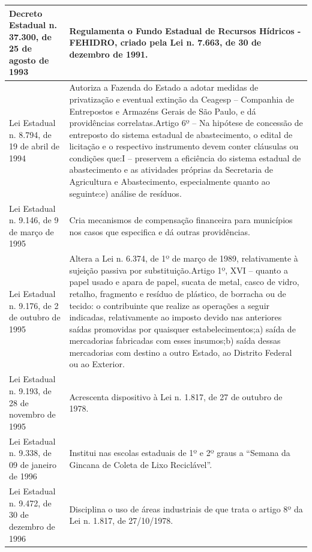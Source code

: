\begin{center}
\begin{longtable}{|p{}|p{}|}
			\hline
			Decreto Estadual n. 37.300, de 25 de agosto de 1993 & Regulamenta o Fundo Estadual de Recursos Hídricos  - FEHIDRO, criado pela Lei n. 7.663, de 30 de dezembro de 1991. \\
			\hline
			Lei Estadual n. 8.794, de 19 de abril de 1994 & Autoriza  a  Fazenda  do  Estado  a  adotar  medidas  de  privatização  e  eventual extinção da Ceagesp – Companhia de Entrepostos e Armazéns Gerais de São Paulo, e dá providências correlatas.\newline{}Artigo  6º  –  Na  hipótese  de  concessão  de  entreposto  do  sistema  estadual  de abastecimento,  o  edital  de  licitação  e  o  respectivo  instrumento  devem  conter cláusulas ou condições que:\newline{}I – preservem a eficiência do sistema estadual de abastecimento e as atividades próprias da Secretaria de Agricultura e Abastecimento, especialmente quanto ao seguinte:\newline{}e) análise de resíduos. \\
			\hline
			Lei Estadual n. 9.146, de 9 de março de 1995 & Cria  mecanismos  de  compensação  financeira  para  municípios  nos  casos  que especifica e dá outras providências. \\
			\hline
			Lei Estadual n. 9.176, de 2 de outubro de 1995 & Altera a Lei n. 6.374, de 1º de março de 1989, relativamente à sujeição passiva por substituição.\newline{}Artigo 1º, XVI – quanto a papel usado e apara de papel, sucata de metal, casco de vidro, retalho, fragmento e resíduo de plástico, de borracha ou de tecido: o contribuinte  que  realize  as  operações  a  seguir  indicadas,  relativamente  ao imposto     devido     nas     anteriores     saídas     promovidas     por     quaisquer estabelecimentos;\newline{}a) saída de mercadorias fabricadas com esses insumos;\newline{}b) saída dessas mercadorias com destino a outro Estado, ao Distrito Federal ou ao Exterior. \\
			\hline
			Lei Estadual n. 9.193, de 28 de novembro de 1995 & Acrescenta dispositivo à Lei n. 1.817, de 27 de outubro de 1978. \\
			\hline
			Lei Estadual n. 9.338, de 09 de janeiro de 1996 & Institui nas escolas estaduais de 1º e 2º graus a “Semana da Gincana de Coleta de Lixo Reciclável”. \\
			\hline
			Lei Estadual n. 9.472, de 30 de dezembro de 1996 & Disciplina o uso de áreas industriais de que trata o artigo 8º da Lei n. 1.817, de 27/10/1978. \\

\end{longtable}
\end{center}
